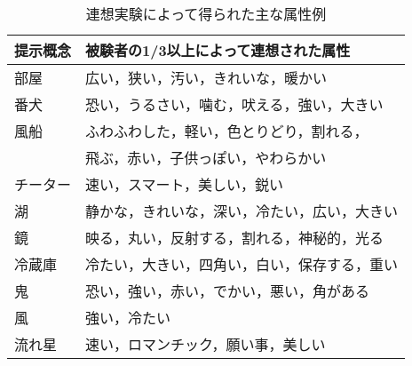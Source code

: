 \begin{table}[tb] 
\caption{連想実験によって得られた主な属性例}
\label{tbl:hyo2}
\begin{center}
\begin{small}
\begin{tabular}{|l|l|}\hline
提示概念&被験者の1/3以上によって連想された属性\\\hline\hline
部屋&   広い，狭い，汚い，きれいな，暖かい\\\hline
番犬&   恐い，うるさい，噛む，吠える，強い，大きい\\\hline
風船&   ふわふわした，軽い，色とりどり，割れる，\\
      &  飛ぶ，赤い，子供っぽい，やわらかい \\\hline
チーター&       速い，スマート，美しい，鋭い\\\hline
湖&     静かな，きれいな，深い，冷たい，広い，大きい\\\hline
鏡&     映る，丸い，反射する，割れる，神秘的，光る\\\hline
冷蔵庫& 冷たい，大きい，四角い，白い，保存する，重い\\\hline
鬼&     恐い，強い，赤い，でかい，悪い，角がある\\\hline
風&     強い，冷たい\\\hline
流れ星& 速い，ロマンチック，願い事，美しい\\\hline
\end{tabular}
\end{small}
\end{center}
\end{table}


